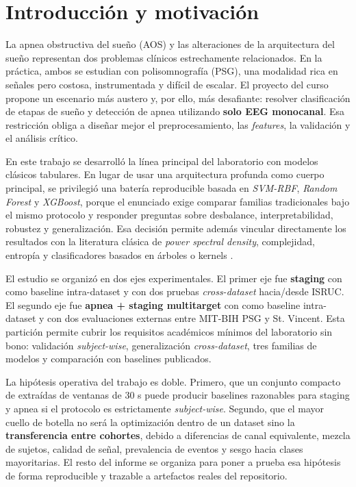 \section{Introducci\'on y motivaci\'on}

La apnea obstructiva del sue\~no (AOS) y las alteraciones de la arquitectura del sue\~no representan dos problemas cl\'inicos estrechamente relacionados. En la pr\'actica, ambos se estudian con polisomnograf\'ia (PSG), una modalidad rica en se\~nales pero costosa, instrumentada y dif\'icil de escalar. El proyecto del curso propone un escenario m\'as austero y, por ello, m\'as desafiante: resolver clasificaci\'on de etapas de sue\~no y detecci\'on de apnea utilizando \textbf{solo EEG monocanal}. Esa restricci\'on obliga a dise\~nar mejor el preprocesamiento, las \emph{features}, la validaci\'on y el an\'alisis cr\'itico.

En este trabajo se desarroll\'o la l\'inea principal del laboratorio con modelos cl\'asicos tabulares. En lugar de usar una arquitectura profunda como cuerpo principal, se privilegi\'o una bater\'ia reproducible basada en \emph{SVM-RBF}, \emph{Random Forest} y \emph{XGBoost}, porque el enunciado exige comparar familias tradicionales bajo el mismo protocolo y responder preguntas sobre desbalance, interpretabilidad, robustez y generalizaci\'on. Esa decisi\'on permite adem\'as vincular directamente los resultados con la literatura cl\'asica de \emph{power spectral density}, complejidad, entrop\'ia y clasificadores basados en \'arboles o kernels \cite{gao2023psdrf,nakamura2017complexity,li2022cascadedsvm}.

El estudio se organiz\'o en dos ejes experimentales. El primer eje fue \textbf{staging} con  como baseline intra-dataset y con dos pruebas \emph{cross-dataset} hacia/desde ISRUC. El segundo eje fue \textbf{apnea + staging multitarget} con  como baseline intra-dataset y con dos evaluaciones externas entre MIT-BIH PSG y St. Vincent. Esta partici\'on permite cubrir los requisitos acad\'emicos m\'inimos del laboratorio sin bono: validaci\'on \emph{subject-wise}, generalizaci\'on \emph{cross-dataset}, tres familias de modelos y comparaci\'on con baselines publicados.

La hip\'otesis operativa del trabajo es doble. Primero, que un conjunto compacto de  extra\'idas de ventanas de 30 s puede producir baselines razonables para staging y apnea si el protocolo es estrictamente \emph{subject-wise}. Segundo, que el mayor cuello de botella no ser\'a la optimizaci\'on dentro de un dataset sino la \textbf{transferencia entre cohortes}, debido a diferencias de canal equivalente, mezcla de sujetos, calidad de se\~nal, prevalencia de eventos y sesgo hacia clases mayoritarias. El resto del informe se organiza para poner a prueba esa hip\'otesis de forma reproducible y trazable a artefactos reales del repositorio.
